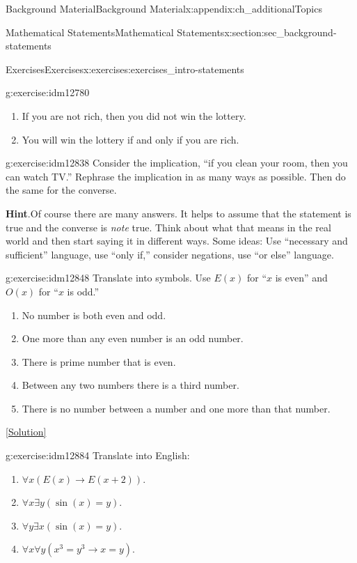\documentclass[oneside,10pt,]{book}
\numberwithin{equation}{chapter}
\def\imp{\rightarrow}
\begin{document}
\begin{appendixptx}{Background Material}{}{Background Material}{}{}{x:appendix:ch_additionalTopics}
\begin{sectionptx}{Mathematical Statements}{}{Mathematical Statements}{}{}{x:section:sec_background-statements}
\begin{exercises-subsection}{Exercises}{}{Exercises}{}{}{x:exercises:exercises_intro-statements}
\begin{divisionexercise}{5}{}{}{g:exercise:idm12780}
\begin{enumerate}[label=(\alph*)]
\item{}If you are not rich, then you did not win the lottery.%
\item{}You will win the lottery if and only if you are rich.%
\end{enumerate}
\end{divisionexercise}%
\begin{divisionexercise}{6}{}{}{g:exercise:idm12838}%
Consider the implication, ``if you clean your room, then you can watch TV.'' Rephrase the implication in as many ways as possible. Then do the same for the converse.%
\par\smallskip%
\noindent\textbf{Hint}.\hypertarget{g:hint:idm12842}{}\quad{}Of course there are many answers. It helps to assume that the statement is true and the converse is \emph{note} true. Think about what that means in the real world and then start saying it in different ways. Some ideas: Use ``necessary and sufficient'' language, use ``only if,'' consider negations, use ``or else'' language.%
\end{divisionexercise}%
\begin{divisionexercise}{7}{}{}{g:exercise:idm12848}%
Translate into symbols. Use \(E(x)\) for ``\(x\) is even'' and \(O(x)\) for ``\(x\) is odd.''%
%
\begin{enumerate}[label=(\alph*)]
\item{}No number is both even and odd.%
\item{}One more than any even number is an odd number.%
\item{}There is prime number that is even.%
\item{}Between any two numbers there is a third number.%
\item{}There is no number between a number and one more than that number.%
\end{enumerate}
\space\hspace*{0pt}\hfill{\tiny\hyperlink{g:solution:idm12868-main}{[Solution]}}\end{divisionexercise}%
\begin{divisionexercise}{8}{}{}{g:exercise:idm12884}%
Translate into English:%
\begin{enumerate}[label=(\alph*)]
\item{}\(\forall x (E(x) \imp E(x +2))\).%
\item{}\(\forall x \exists y (\sin(x) = y)\).%
\item{}\(\forall y \exists x (\sin(x) = y)\).%
\item{}\(\forall x \forall y (x^3 = y^3 \imp x = y)\).%

\end{enumerate}
\end{divisionexercise}
\end{exercises-subsection}
\end{sectionptx}
\end{appendixptx}
\end{document}
